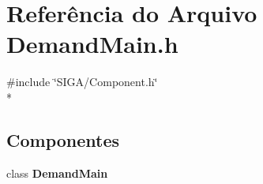 \section{Referência do Arquivo Demand\+Main.\+h}
\label{_demand_main_8h}
{\ttfamily \#include \char`\"{}S\+I\+G\+A/\+Component.\+h\char`\"{}}\\*
\subsection*{Componentes}
\begin{DoxyCompactItemize}
\item 
class {\bf Demand\+Main}
\end{DoxyCompactItemize}
